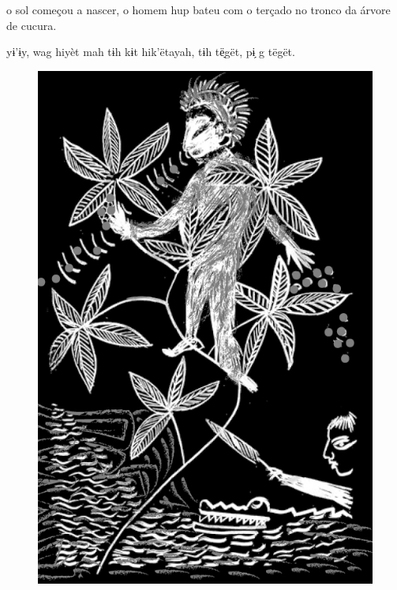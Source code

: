 \chapter*{}

\mbox{}\vspace*{\fill}


 o sol
começou a nascer,
o homem hup bateu
com o terçado no
tronco da árvore
de cucura.

\vspace{2em}

 yɨ’ɨy, wag
hiyèt mah tɨh kɨt
hik’ëtayah, tɨh
të̖gët, pɨ̗ g tëgët.

\vspace*{\fill}

\begin{figure}
\vspace*{-1.5cm}
\hspace*{-2.4cm}\includegraphics[width=142mm]{./imgs/img5.jpg}
\end{figure}

